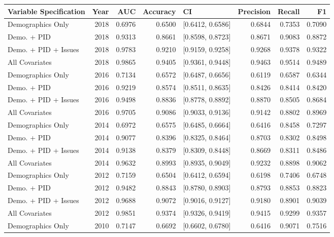 \begin{table}[H]
\centering
\begin{tabular}{lrrrlrrr}
  \toprule
Variable Specification & Year & AUC & Accuracy & CI & Precision & Recall & F1 \\ 
  \midrule
Demographics Only & 2018 & 0.6976 & 0.6500 & [0.6412, 0.6586] & 0.6844 & 0.7353 & 0.7090 \\ 
  Demo. + PID & 2018 & 0.9313 & 0.8661 & [0.8598, 0.8723] & 0.8671 & 0.9083 & 0.8872 \\ 
  Demo. + PID + Issues & 2018 & 0.9783 & 0.9210 & [0.9159, 0.9258] & 0.9268 & 0.9378 & 0.9322 \\ 
  All Covariates & 2018 & 0.9865 & 0.9405 & [0.9361, 0.9448] & 0.9463 & 0.9514 & 0.9489 \\ 
  Demographics Only & 2016 & 0.7134 & 0.6572 & [0.6487, 0.6656] & 0.6119 & 0.6587 & 0.6344 \\ 
  Demo. + PID & 2016 & 0.9219 & 0.8574 & [0.8511, 0.8635] & 0.8426 & 0.8414 & 0.8420 \\ 
  Demo. + PID + Issues & 2016 & 0.9498 & 0.8836 & [0.8778, 0.8892] & 0.8870 & 0.8505 & 0.8684 \\ 
  All Covariates & 2016 & 0.9705 & 0.9086 & [0.9033, 0.9136] & 0.9142 & 0.8802 & 0.8969 \\ 
  Demographics Only & 2014 & 0.6972 & 0.6575 & [0.6485, 0.6664] & 0.6416 & 0.8458 & 0.7297 \\ 
  Demo. + PID & 2014 & 0.9077 & 0.8396 & [0.8325, 0.8464] & 0.8703 & 0.8302 & 0.8498 \\ 
  Demo. + PID + Issues & 2014 & 0.9138 & 0.8379 & [0.8309, 0.8448] & 0.8669 & 0.8311 & 0.8486 \\ 
  All Covariates & 2014 & 0.9632 & 0.8993 & [0.8935, 0.9049] & 0.9232 & 0.8898 & 0.9062 \\ 
  Demographics Only & 2012 & 0.7159 & 0.6504 & [0.6412, 0.6594] & 0.6198 & 0.7406 & 0.6748 \\ 
  Demo. + PID & 2012 & 0.9482 & 0.8843 & [0.8780, 0.8903] & 0.8793 & 0.8853 & 0.8823 \\ 
  Demo. + PID + Issues & 2012 & 0.9688 & 0.9072 & [0.9016, 0.9127] & 0.9180 & 0.8901 & 0.9039 \\ 
  All Covariates & 2012 & 0.9851 & 0.9374 & [0.9326, 0.9419] & 0.9415 & 0.9299 & 0.9357 \\ 
  Demographics Only & 2010 & 0.7147 & 0.6692 & [0.6602, 0.6780] & 0.6416 & 0.9071 & 0.7516 \\ 

\end{tabular}
\end{table}
